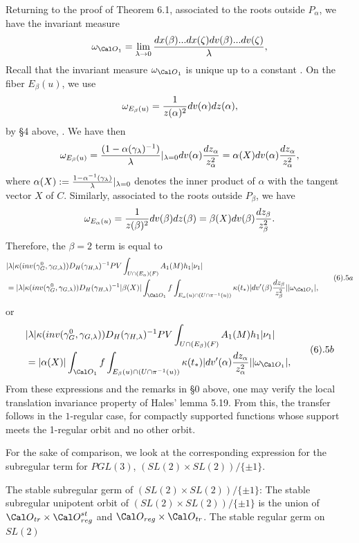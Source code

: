 Returning to the proof of Theorem 6.1,
associated to the roots outside $P_\alpha$, we have the invariant measure
$$
\omega_{{\Cal O}_1}=
\lim_{\lambda\rightarrow 0}
{dx(\beta)...dx(\zeta)dv(\beta)...dv(\zeta)\over \lambda},
$$
Recall that the invariant measure $\omega_{{\Cal O}_1}$ is
unique up to a constant \cite{R}. On the fiber $E_\beta(u)$, we use
$$
\omega_{E_\beta(u)}={1\over z(\alpha)^2}dv(\alpha)dz(\alpha),
$$
by
\S 4 above, \cite{L, Lemma 2.12}. We have then
$$
\omega_{E_\beta(u)}=
{(1-\alpha (\gamma_\lambda)^{-1})\over \lambda}|_{\lambda=0}
dv(\alpha){dz_\alpha\over z_\alpha^2}
={\alpha(X)}dv(\alpha){dz_\alpha\over z_\alpha^2},
$$
where $\alpha(X):={1-\alpha^{-1}(\gamma_\lambda)\over\lambda}|_{\lambda=0}$ 
denotes the inner product of $\alpha$ with the tangent vector $X$ of $C$.
Similarly, associated to the roots outside $P_\beta$, we have
$$
\omega_{E_\alpha(u)}={1\over z(\beta)^2}dv(\beta)dz(\beta)
={\beta(X)}dv(\beta){dz_\beta\over z_\beta^2}.
$$
Therefore, the $\beta =2$ term is equal to
$$
\split
&|\lambda|\kappa(inv(\gamma_G^0,\gamma_{G,\lambda}))
D_H(\gamma_{H,\lambda})^{-1} 
PV\int_{U\cap (E_\alpha)(F)}A_1(M)h_1|\nu_1|\\
&=
|\lambda|\kappa(inv(\gamma_G^0,\gamma_{G,\lambda}))
D_H(\gamma_{H,\lambda})^{-1} 
|\beta(X)|\int_{{\Cal O}_1}f\int_{E_\alpha(u)\cap (U\cap \pi^{-1}(u))}
\kappa(t_*)|dv'(\beta)
{dz_\beta\over z_\beta^2}||\omega_{{\Cal O}_1}|,
\endsplit
\tag 6.5a
$$
or
$$
\split
&|\lambda|\kappa(inv(\gamma_G^0,\gamma_{G,\lambda}))
D_H(\gamma_{H,\lambda})^{-1} 
PV\int_{U\cap (E_\beta)(F)}A_1(M)h_1|\nu_1|\\
&=|\alpha(X)|\int_{{\Cal O}_1}f\int_{E_\beta(u)\cap (U\cap \pi^{-1}(u))}
\kappa(t_*)|dv'(\alpha)
{dz_\alpha\over z_\alpha^2}||\omega_{{\Cal O}_1}|,
\endsplit
\tag 6.5b
$$
From these expressions and the remarks in \S 0 above, 
one may verify the local translation invariance 
property of Hales' lemma 5.19.
From this, the transfer follows in the $1$-regular case,
for compactly supported functions whose support meets the 1-regular
orbit and no other orbit.
\enddocument
\par
For the sake of comparison, we look at
the corresponding expression for the subregular 
term for $PGL(3)$, $(SL(2)\times SL(2))/\{\pm 1\}$. 
\par
The stable subregular germ of $(SL(2)\times SL(2))/\{\pm 1\}$: 
The stable subregular
unipotent orbit of $(SL(2)\times SL(2))/\{\pm 1\}$ is the union of
${\Cal O}_{tr}\times {\Cal O}_{reg}^{st}$ and
${\Cal O}_{reg}\times {\Cal O}_{tr}$. The stable regular germ on $SL(2)$
